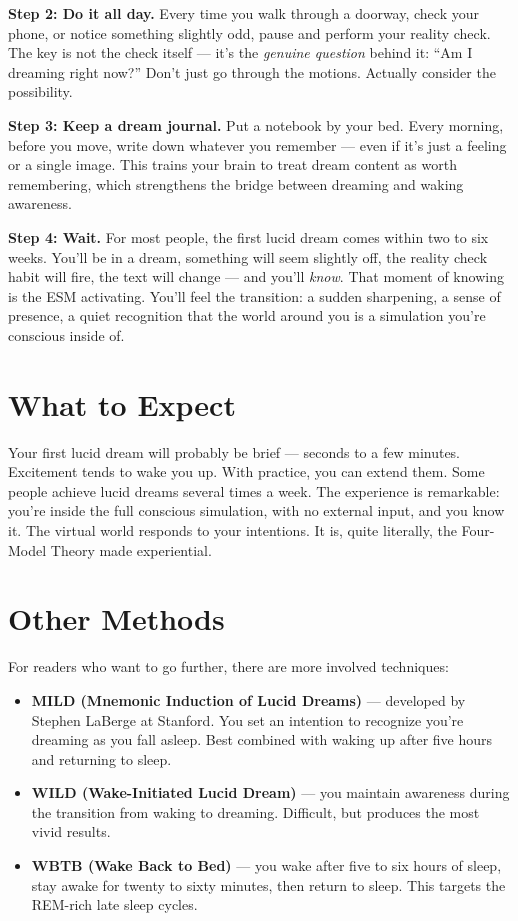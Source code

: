 \documentclass[11pt, twoside, openright]{book}
\begin{document}
\textbf{Step 2: Do it all day.} Every time you walk through a doorway, check your phone, or notice something slightly odd, pause and perform your reality check. The key is not the check itself --- it's the \textit{genuine question} behind it: ``Am I dreaming right now?'' Don't just go through the motions. Actually consider the possibility.

\textbf{Step 3: Keep a dream journal.} Put a notebook by your bed. Every morning, before you move, write down whatever you remember --- even if it's just a feeling or a single image. This trains your brain to treat dream content as worth remembering, which strengthens the bridge between dreaming and waking awareness.

\textbf{Step 4: Wait.} For most people, the first lucid dream comes within two to six weeks. You'll be in a dream, something will seem slightly off, the reality check habit will fire, the text will change --- and you'll \textit{know}. That moment of knowing is the ESM activating. You'll feel the transition: a sudden sharpening, a sense of presence, a quiet recognition that the world around you is a simulation you're conscious inside of.

\section*{What to Expect}

Your first lucid dream will probably be brief --- seconds to a few minutes. Excitement tends to wake you up. With practice, you can extend them. Some people achieve lucid dreams several times a week. The experience is remarkable: you're inside the full conscious simulation, with no external input, and you know it. The virtual world responds to your intentions. It is, quite literally, the Four-Model Theory made experiential.

\section*{Other Methods}

For readers who want to go further, there are more involved techniques:

\begin{itemize}
  \item \textbf{MILD (Mnemonic Induction of Lucid Dreams)} --- developed by Stephen LaBerge at Stanford. You set an intention to recognize you're dreaming as you fall asleep. Best combined with waking up after five hours and returning to sleep.
  \item \textbf{WILD (Wake-Initiated Lucid Dream)} --- you maintain awareness during the transition from waking to dreaming. Difficult, but produces the most vivid results.
  \item \textbf{WBTB (Wake Back to Bed)} --- you wake after five to six hours of sleep, stay awake for twenty to sixty minutes, then return to sleep. This targets the REM-rich late sleep cycles.
\end{itemize}
\end{document}
